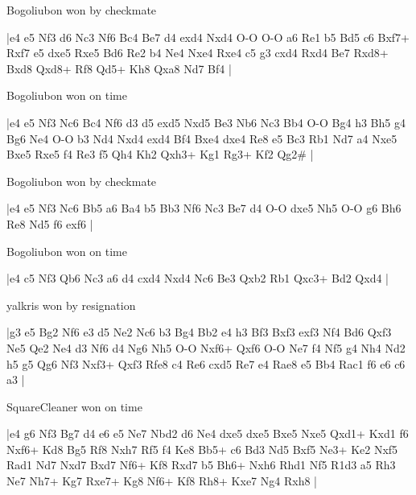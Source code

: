 \showboard

Bogoliubon won by checkmate

\makegametitle
|e4 e5 Nf3 d6 Nc3 Nf6 Bc4 Be7 d4 exd4 Nxd4 O-O O-O a6 Re1 b5 Bd5 c6 Bxf7+ Rxf7 e5 dxe5 Rxe5 Bd6 Re2 b4 Ne4 Nxe4 Rxe4 c5 g3 cxd4 Rxd4 Be7 Rxd8+ Bxd8 Qxd8+ Rf8 Qd5+ Kh8 Qxa8 Nd7 Bf4  |

\showboard

Bogoliubon won on time

\makegametitle
|e4 e5 Nf3 Nc6 Bc4 Nf6 d3 d5 exd5 Nxd5 Be3 Nb6 Nc3 Bb4 O-O Bg4 h3 Bh5 g4 Bg6 Ne4 O-O b3 Nd4 Nxd4 exd4 Bf4 Bxe4 dxe4 Re8 e5 Bc3 Rb1 Nd7 a4 Nxe5 Bxe5 Rxe5 f4 Re3 f5 Qh4 Kh2 Qxh3+ Kg1 Rg3+ Kf2 Qg2\#  |

\showboard

Bogoliubon won by checkmate

\makegametitle
|e4 e5 Nf3 Nc6 Bb5 a6 Ba4 b5 Bb3 Nf6 Nc3 Be7 d4 O-O dxe5 Nh5 O-O g6 Bh6 Re8 Nd5 f6 exf6  |

\showboard

Bogoliubon won on time

\makegametitle
|e4 c5 Nf3 Qb6 Nc3 a6 d4 cxd4 Nxd4 Nc6 Be3 Qxb2 Rb1 Qxc3+ Bd2 Qxd4  |

\showboard

yalkris won by resignation

\makegametitle
|g3 e5 Bg2 Nf6 e3 d5 Ne2 Nc6 b3 Bg4 Bb2 e4 h3 Bf3 Bxf3 exf3 Nf4 Bd6 Qxf3 Ne5 Qe2 Ne4 d3 Nf6 d4 Ng6 Nh5 O-O Nxf6+ Qxf6 O-O Ne7 f4 Nf5 g4 Nh4 Nd2 h5 g5 Qg6 Nf3 Nxf3+ Qxf3 Rfe8 c4 Re6 cxd5 Re7 e4 Rae8 e5 Bb4 Rac1 f6 e6 c6 a3  |

\showboard

SquareCleaner won on time

\makegametitle
|e4 g6 Nf3 Bg7 d4 e6 e5 Ne7 Nbd2 d6 Ne4 dxe5 dxe5 Bxe5 Nxe5 Qxd1+ Kxd1 f6 Nxf6+ Kd8 Bg5 Rf8 Nxh7 Rf5 f4 Ke8 Bb5+ c6 Bd3 Nd5 Bxf5 Ne3+ Ke2 Nxf5 Rad1 Nd7 Nxd7 Bxd7 Nf6+ Kf8 Rxd7 b5 Bh6+ Nxh6 Rhd1 Nf5 R1d3 a5 Rh3 Ne7 Nh7+ Kg7 Rxe7+ Kg8 Nf6+ Kf8 Rh8+ Kxe7 Ng4 Rxh8  |

